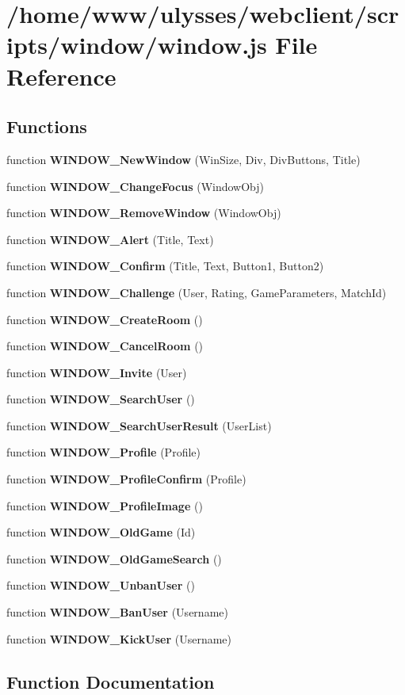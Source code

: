 \section{/home/www/ulysses/webclient/scripts/window/window.js File Reference}
\label{window_2window_8js}
\subsection*{Functions}
\begin{CompactItemize}
\item 
function {\bf WINDOW\_\-NewWindow} (WinSize, Div, DivButtons, Title)
\item 
function {\bf WINDOW\_\-ChangeFocus} (WindowObj)
\item 
function {\bf WINDOW\_\-RemoveWindow} (WindowObj)
\item 
function {\bf WINDOW\_\-Alert} (Title, Text)
\item 
function {\bf WINDOW\_\-Confirm} (Title, Text, Button1, Button2)
\item 
function {\bf WINDOW\_\-Challenge} (User, Rating, GameParameters, MatchId)
\item 
function {\bf WINDOW\_\-CreateRoom} ()
\item 
function {\bf WINDOW\_\-CancelRoom} ()
\item 
function {\bf WINDOW\_\-Invite} (User)
\item 
function {\bf WINDOW\_\-SearchUser} ()
\item 
function {\bf WINDOW\_\-SearchUserResult} (UserList)
\item 
function {\bf WINDOW\_\-Profile} (Profile)
\item 
function {\bf WINDOW\_\-ProfileConfirm} (Profile)
\item 
function {\bf WINDOW\_\-ProfileImage} ()
\item 
function {\bf WINDOW\_\-OldGame} (Id)
\item 
function {\bf WINDOW\_\-OldGameSearch} ()
\item 
function {\bf WINDOW\_\-UnbanUser} ()
\item 
function {\bf WINDOW\_\-BanUser} (Username)
\item 
function {\bf WINDOW\_\-KickUser} (Username)
\end{CompactItemize}


\subsection{Function Documentation}
